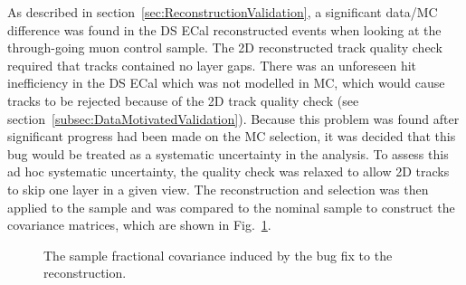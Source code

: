 \newline
\newline
As described in section~\ref{sec:ReconstructionValidation}, a significant data/MC difference was found in the DS ECal reconstructed events when looking at the through-going muon control sample.  The 2D reconstructed track quality check required that tracks contained no layer gaps.  There was an unforeseen hit inefficiency in the DS ECal which was not modelled in MC, which would cause tracks to be rejected because of the 2D track quality check (see section~\ref{subsec:DataMotivatedValidation}).  Because this problem was found after significant progress had been made on the MC selection, it was decided that this bug would be treated as a systematic uncertainty in the analysis.  To assess this ad hoc systematic uncertainty, the quality check was relaxed to allow 2D tracks to skip one layer in a given view.  The reconstruction and selection was then applied to the sample and was compared to the nominal sample to construct the covariance matrices, which are shown in Fig.~\ref{fig:ECalHoughBugCovarianceMatrices}.
\begin{figure}[b!]
  \centering
  \caption{The sample fractional covariance induced by the bug fix to the reconstruction.}
  \label{fig:ECalHoughBugCovarianceMatrices}
\end{figure}
